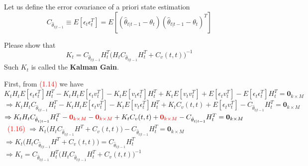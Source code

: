 \documentclass[a4 paper]{article}
\begin{document}
Let us define the error covariance of a priori state estimation
\begin{equation}
    C_{\hat{\theta}_{t|t-1}}\equiv E[\epsilon_t\epsilon_t^T]=E[(\hat{\theta}_{t|t-1}-\theta_t)(\hat{\theta}_{t|t-1}-\theta_t)^T]
\end{equation}
\begin{tcolorbox}[colback=RubineRed!5!white,colframe=RubineRed!75!black]
Please show that 
\begin{equation}
    K_t=C_{\hat{\theta}_{t|t-1}}H_t^T\Big(H_tC_{\hat{\theta}_{t|t-1}}H_t^T+C_v(t,t)\Big)^{-1}
\end{equation}
Such $K_t$ is called the \textbf{Kalman Gain}. 
\end{tcolorbox}
\begin{tcolorbox}[colback=YellowGreen!5!white,colframe=YellowGreen!75!black,title={Problem 4's answer}]
    First, from \textcolor{red}{(1.14)} we have\newline
    $K_tH_tE[\epsilon_t\epsilon_t^T]H^T_t-K_tH_tE[\epsilon_tv^T_t]-K_tE[v_t\epsilon_t^T]H^T_t+K_tE[v_tv^T_t]+E[\epsilon_tv^T_t]-E[\epsilon_t\epsilon_t^T]H^T_t=\textbf{0}_{k\times M}$\newline
    $\Rightarrow K_tH_tC_{\hat{\theta}_{t|t-1}}H^T_t-K_tH_tE[\epsilon_tv^T_t]-K_tE[v_t\epsilon_t^T]H^T_t+K_tC_v(t,t)+E[\epsilon_tv^T_t]-C_{\hat{\theta}_{t|t-1}}H^T_t=\textbf{0}_{k\times M}$\newline
    $\Rightarrow K_tH_tC_{\hat{\theta}_{t|t-1}}H^T_t-\textcolor{red}{\textbf{0}_{k\times M}}-\textcolor{red}{\textbf{0}_{k\times M}}+K_tC_v(t,t)+\textcolor{red}{\textbf{0}_{k\times M}}-C_{\hat{\theta}_{t|t-1}}H^T_t=\textbf{0}_{k\times M}$ \ \textcolor{red}{(1.16)}\newline
    $\Rightarrow K_t\Big(H_tC_{\hat{\theta}_{t|t-1}}H^T+C_v(t,t)\Big)-C_{\hat{\theta}_{t|t-1}}H^T_t=\textbf{0}_{k\times M}$\newline
    $\Rightarrow K_t\Big(H_tC_{\hat{\theta}_{t|t-1}}H^T+C_v(t,t)\Big)=C_{\hat{\theta}_{t|t-1}}H^T_t$\newline
    $\Rightarrow K_t=C_{\hat{\theta}_{t|t-1}}H_t^T\Big(H_tC_{\hat{\theta}_{t|t-1}}H_t^T+C_v(t,t)\Big)^{-1}$
\end{tcolorbox}
\end{document}
